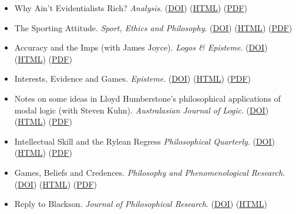\documentclass[
  10pt,
  letterpaper,
  DIV=11,
  numbers=noendperiod,
  twoside]{scrartcl}
\providecommand{\tightlist}{%
  \setlength{\itemsep}{0pt}\setlength{\parskip}{0pt}}\usepackage{longtable,booktabs,array}
\begin{document}
\begin{itemize}
\tightlist
\item
  Why Ain't Evidentialists Rich? \emph{Analysis}.
  (\href{https://doi.org/10.1093/analys/anae038}{DOI})
  (\href{posts/war-on-war/war-on-war.html}{HTML})
  (\href{posts/war-on-war/A\%20Dynamic\%20War\%20on\%20EDT.pdf}{PDF})
\item
  The Sporting Attitude. \emph{Sport, Ethics and Philosophy}.
  (\href{https://doi.org/10.1080/17511321.2021.1974531}{DOI})
  (\href{posts/borge/the-sporting-attitude.html}{HTML})
  (\href{posts/borge/The\%20Sporting\%20Attitude.pdf}{PDF})
\item
  Accuracy and the Imps (with James Joyce). \emph{Logos \& Episteme}.
  (\href{https://doi.org/10.5840/logos-episteme201910325}{DOI})
  (\href{posts/imps/accuracy-and-the-imps.html}{HTML})
  (\href{posts/imps/Accuracy\%20and\%20the\%20Imps.pdf}{PDF})
\item
  Interests, Evidence and Games. \emph{Episteme}.
  (\href{https://doi.org/10.1017/epi.2018.26}{DOI})
  (\href{posts/ieg/interests-evidence-and-games.html}{HTML})
  (\href{posts/ieg/Interests,\%20Evidence\%20and\%20Games.pdf}{PDF})
\item
  Notes on some ideas in Lloyd Humberstone's philosophical applications
  of modal logic (with Steven Kuhn). \emph{Australasian Journal of
  Logic}. (\href{https://doi.org/10.26686/ajl.v15i1.4072}{DOI})
  (\href{posts/humberstone-modal/notes-on-some-ideas-in-lloyd-humberstones-philosophical-applications-of-modal-logic.html}{HTML})
  (\href{posts/humberstone-modal/Notes\%20on\%20Some\%20Ideas\%20in\%20Lloyd\%20Humberstone’s\%20Philosophical\%20Applications\%20of\%20Modal\%20Logic.pdf}{PDF})
\item
  Intellectual Skill and the Rylean Regress \emph{Philosophical
  Quarterly}.
  (\href{http://dx.doi.org/10.1111/j.0031-8094.2001.00224.x}{DOI})
  (\href{./posts/ryle-regress/ryle-regress.html}{HTML})
  (\href{./posts/ryle-regress/Intellectual\%20Skill\%20and\%20the\%20Rylean\%20Regress.pdf}{PDF})
\item
  Games, Beliefs and Credences. \emph{Philosophy and Phenomenological
  Research}.
  (\href{http://dx.doi.org/10.1111/j.0031-8094.2001.00224.x}{DOI})
  (\href{./posts/gbc/games-beliefs-and-credences.html}{HTML})
  (\href{./posts/gbc/Games,\%20Beliefs\%20and\%20Credences.pdf}{PDF})
\item
  Reply to Blackson. \emph{Journal of Philosophical Research}.
  (\href{https://doi.org/10.5840/jpr201663072}{DOI})
  (\href{./posts/reply-blackson/reply-to-blackson.html}{HTML})

\end{itemize}
\end{document}
